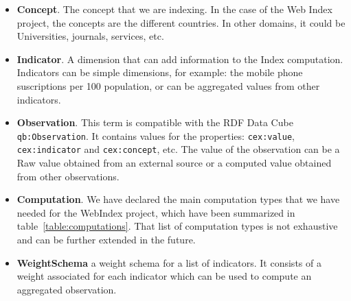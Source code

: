 \begin{itemize}
\item\textbf{Concept}. The concept that we are indexing. In the case of the Web
Index project, the concepts are the different countries. In other domains, it
could be Universities, journals, services, etc.

\item\textbf{Indicator}. A dimension that can add information to the Index
computation. Indicators can be simple dimensions, for example: the mobile phone
suscriptions per 100 population, or can be aggregated values from other
indicators. 

\item\textbf{Observation}. This term is compatible with the
RDF Data Cube \lstinline|qb:Observation|. It contains values for the
properties: \lstinline|cex:value|, 
   \lstinline|cex:indicator| and 
   \lstinline|cex:concept|, etc. The value of the observation can be a Raw value
   obtained from an external source or a computed value obtained from other
   observations.

\item\textbf{Computation}. We have declared the main computation types that we
have needed for the WebIndex project, which have been summarized in
table~\ref{table:computations}. That list of computation types is not exhaustive
and can be further extended in the future. 

\item\textbf{WeightSchema} a weight schema for a list of indicators. It consists
of a weight associated for each indicator which can be used to compute an
aggregated observation.

\end{itemize}

